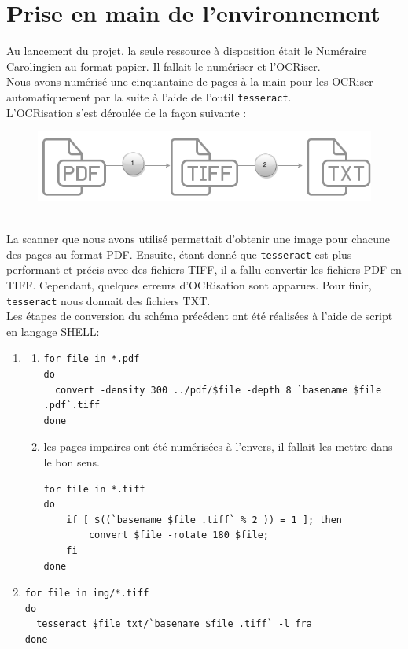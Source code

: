 \documentclass[a4paper, 11pt]{report}
\begin{document}
	\section{Prise en main de l'environnement}
	Au lancement du projet, la seule ressource à disposition était le Numéraire Carolingien au format papier. Il fallait le numériser et l'OCRiser.\\
    Nous avons numérisé une cinquantaine de pages à la main pour les OCRiser automatiquement par la suite à l'aide de l'outil \texttt{tesseract}.\\

    L'OCRisation s'est déroulée de la façon suivante : 
    \begin{figure}[h]
    \centering
    \includegraphics[scale=.3]{img/OCRisation.png}
    \end{figure}\\
    La scanner que nous avons utilisé permettait d'obtenir une image pour chacune des pages au format PDF. Ensuite, étant donné que  \texttt{tesseract} est plus performant et précis avec des fichiers TIFF, il a fallu convertir les fichiers PDF en TIFF. Cependant, quelques erreurs d'OCRisation sont apparues. Pour finir,  \texttt{tesseract} nous donnait des fichiers TXT.\\
    Les étapes de conversion du schéma précédent ont été réalisées à l'aide de script en langage SHELL:
    \begin{enumerate}
        \item \begin{enumerate}
    	      \item	
           \begin{verbatim}
for file in *.pdf
do
  convert -density 300 ../pdf/$file -depth 8 `basename $file .pdf`.tiff
done
           \end{verbatim}
          \item les pages impaires ont été numérisées à l'envers, il fallait les mettre dans le bon sens.
          \begin{verbatim}
for file in *.tiff
do
    if [ $((`basename $file .tiff` % 2 )) = 1 ]; then
        convert $file -rotate 180 $file;
    fi
done
          \end{verbatim}
       \end{enumerate}
    \item 
    \begin{verbatim}
for file in img/*.tiff
do
  tesseract $file txt/`basename $file .tiff` -l fra
done 
    \end{verbatim}
    \end{enumerate}
    
\end{document}
